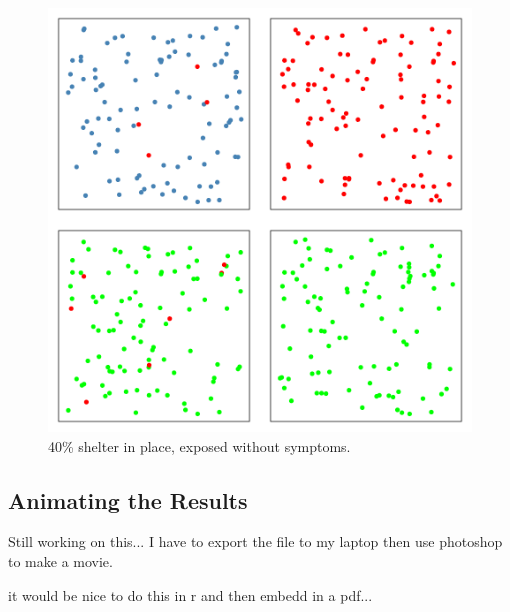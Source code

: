 \documentclass{article}\usepackage[]{graphicx}\usepackage[]{color}
\begin{document}
\begin{figure}
\includegraphics[width=1\textwidth]{SSModel4.png}
\caption{40\% shelter in place, exposed without symptoms.}
\end{figure}
\subsection{Animating the Results}

Still working on this... I have to export the file to my laptop then use photoshop to make a movie.

it would be nice to do this in r and then embedd in a pdf...
\end{document}
